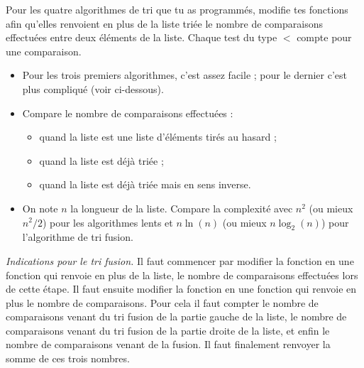 \documentclass[11pt,class=report,crop=false]{standalone}
\begin{document}
\begin{activite}
	
	
	Pour les quatre algorithmes de tri que tu as programmés, modifie tes fonctions afin qu'elles renvoient en plus de la liste triée le nombre de comparaisons effectuées entre deux éléments de la liste. Chaque test du type \og{} $<$ \fg{} compte pour une comparaison.
	
	\bigskip
	
	\begin{itemize}
		\item Pour les trois premiers algorithmes, c'est assez facile ; pour le dernier c'est plus compliqué (voir ci-dessous).
		\item Compare le nombre de comparaisons effectuées : 
		\begin{itemize}
			\item quand la liste est une liste d'éléments tirés au hasard ; 
			\item quand la liste est déjà triée ;
			\item quand la liste est déjà triée mais en sens inverse.
		\end{itemize}
	\item On note $n$ la longueur de la liste. Compare la complexité avec $n^2$ (ou mieux $n^2/2$) pour les algorithmes lents et $n \ln(n)$ (ou mieux $n\log_2(n)$) pour l'algorithme de tri fusion.
	\end{itemize}

	\bigskip
	
	\emph{Indications pour le tri fusion.}
	Il faut commencer par modifier la fonction  en une fonction  qui renvoie en plus de la liste, le nombre de comparaisons effectuées lors de cette étape.
	Il faut ensuite modifier la fonction  en une fonction  qui renvoie en plus le nombre de comparaisons. Pour cela il faut compter le nombre de comparaisons venant du tri fusion de la partie gauche de la liste, le nombre de comparaisons venant du tri fusion de la partie droite de la liste, et enfin le nombre de comparaisons venant de la fusion. Il faut finalement renvoyer la somme de ces trois nombres.
	
\end{activite}

\bigskip

\end{document}
